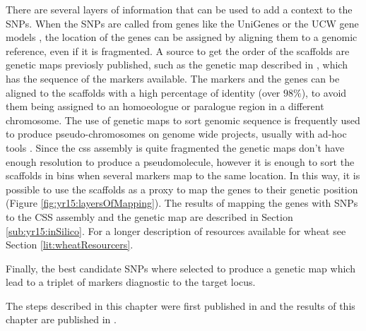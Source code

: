 There are several layers of information that can be used to add a context to the SNPs. 
When the SNPs are called from genes like the UniGenes \citep{PontiusJUWagnerL2002} or the UCW gene models \citep{Krasileva2013}, the location of the genes can be assigned by aligning them to a genomic reference, even if it is fragmented. 
A source to get the order of the scaffolds are genetic maps previosly published, such as the genetic map described in \citet{Wang2014}, which has the sequence of the markers available.
The markers and the genes can be aligned to the scaffolds with a high percentage of identity (over $98\%$), to avoid them being assigned to an homoeologue or paralogue region in a different chromosome.
The use of genetic maps to sort genomic sequence is frequently used to produce pseudo-chromosomes on genome wide projects, usually with ad-hoc tools \citep{Tang2015}.
Since the \acrshort{css} assembly is quite fragmented the genetic maps don't have enough resolution to produce a pseudomolecule, however it is enough to sort the scaffolds in bins when several markers map to the same location. 
In this way, it is possible to use the scaffolds as a proxy to map the genes to their genetic position (Figure \ref{fig:yr15:layersOfMapping}).
The results of mapping the genes with SNPs to the CSS assembly and the genetic map are described in Section \ref{sub:yr15:inSilico}. 
For a longer description of resources available for wheat see Section \ref{lit:wheatResourcers}. 

Finally, the best candidate SNPs where selected to produce a genetic map which lead to a triplet of markers diagnostic to the target locus. 

The steps described in this chapter were first published in \citet{Ramirez-Gonzalez2015c} and the results of this chapter are published in \citet{Ramirez-Gonzalez2015b}.

